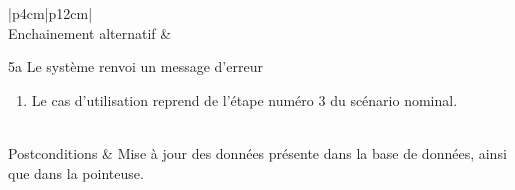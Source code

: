 \begin{longtable}{|p{4cm}|p{12cm}|}
                    \\
                    \hline
                    Enchainement alternatif & 
                    \begin{minipage}[t]{\linewidth}
                            5a Le système renvoi un message d’erreur
                            \begin{enumerate}[nosep,after=\strut]
                                \item Le cas d’utilisation reprend de l’étape numéro 3 du scénario nominal.   
                            \end{enumerate}
                    \end{minipage}
                    \\
                    
                    \hline
                    Postconditions & Mise à jour des données présente dans la base de données, ainsi que dans la pointeuse.
                    \\
                    \hline
                    \caption{Description du cas d'utilisation « Supprimer une empreinte »}\\
            \end{longtable}        
        
